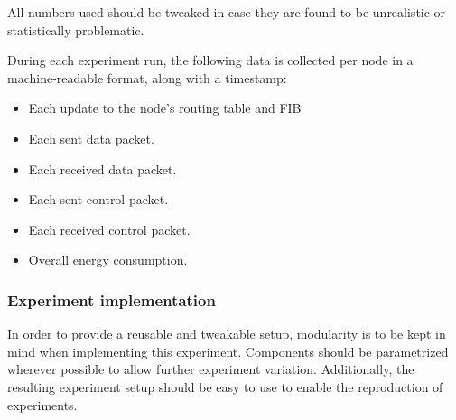 \documentclass{acm_proc_article-sp}
\begin{document}
All numbers used should be tweaked in case they are found to be unrealistic or statistically problematic.

During each experiment run, the following data is collected per node in a machine-readable format, along with a timestamp:
\begin{itemize}
\item Each update to the node's routing table and \gls{FIB}
\item Each sent data packet.
\item Each received data packet.
\item Each sent control packet.
\item Each received control packet.
\item Overall energy consumption.
\end{itemize}

\subsubsection{Experiment implementation}
\label{subsec:implementation}
In order to provide a reusable and tweakable setup, modularity is to be kept in mind when implementing this experiment. Components should be parametrized wherever possible to allow further experiment variation. Additionally, the resulting experiment setup should be easy to use to enable the reproduction of experiments.
\end{document}
